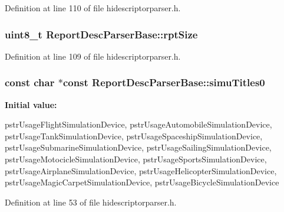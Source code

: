 \-Definition at line 110 of file hidescriptorparser.\-h.

\hypertarget{class_report_desc_parser_base_a222b1c03a4f3e49283a58ecaa853e247}{
\subsubsection[{rpt\-Size}]{\setlength{\rightskip}{0pt plus 5cm}uint8\-\_\-t {\bf \-Report\-Desc\-Parser\-Base\-::rpt\-Size}}}\label{class_report_desc_parser_base_a222b1c03a4f3e49283a58ecaa853e247}


\-Definition at line 109 of file hidescriptorparser.\-h.

\hypertarget{class_report_desc_parser_base_a6995298d3333564e02e06bf94f0ca5ca}{
\subsubsection[{simu\-Titles0}]{\setlength{\rightskip}{0pt plus 5cm}const char $\ast$const {\bf \-Report\-Desc\-Parser\-Base\-::simu\-Titles0}}}\label{class_report_desc_parser_base_a6995298d3333564e02e06bf94f0ca5ca}
{\bfseries \-Initial value\-:}
\begin{DoxyCode}
 {
        pstrUsageFlightSimulationDevice,
        pstrUsageAutomobileSimulationDevice,
        pstrUsageTankSimulationDevice,
        pstrUsageSpaceshipSimulationDevice,
        pstrUsageSubmarineSimulationDevice,
        pstrUsageSailingSimulationDevice,
        pstrUsageMotocicleSimulationDevice,
        pstrUsageSportsSimulationDevice,
        pstrUsageAirplaneSimulationDevice,
        pstrUsageHelicopterSimulationDevice,
        pstrUsageMagicCarpetSimulationDevice,
        pstrUsageBicycleSimulationDevice
}
\end{DoxyCode}


\-Definition at line 53 of file hidescriptorparser.\-h.

